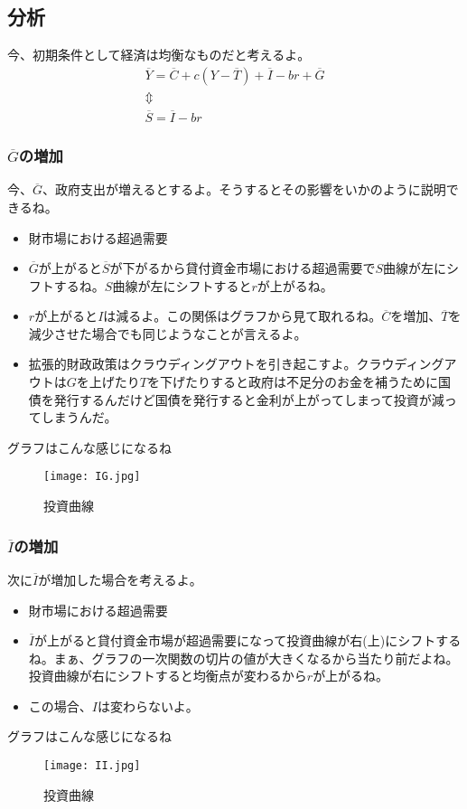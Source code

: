 \documentclass[a4paper, 12pt]{article}
\begin{document}
\subsection{分析}
今、初期条件として経済は均衡なものだと考えるよ。
\begin{displaymath}
  \begin{array}{c}
    \overline{Y}=\overline{C}+c(Y-\overline{T})+\overline{I}-br+\overline{G}\\
    \Updownarrow \\
    \overline{S}=\overline{I}-br
  \end{array}
\end{displaymath}

\subsubsection{$\overline{G}$の増加}
今、$\overline{G}$、政府支出が増えるとするよ。そうするとその影響をいかのように説明できるね。
\begin{itemize}
  \item 財市場における超過需要
  \item $\overline{G}$が上がると$\overline{S}$が下がるから貸付資金市場における超過需要で$S$曲線が左にシフトするね。$S$曲線が左にシフトすると$r$が上がるね。
  \item $r$が上がると$I$は減るよ。この関係はグラフから見て取れるね。$\overline{C}$を増加、$\overline{T}$を減少させた場合でも同じようなことが言えるよ。
  \item 拡張的財政政策はクラウディングアウトを引き起こすよ。クラウディングアウトは$G$を上げたり$T$を下げたりすると政府は不足分のお金を補うために国債を発行するんだけど国債を発行すると金利が上がってしまって投資が減ってしまうんだ。
\end{itemize}
グラフはこんな感じになるね
\begin{figure}[h]
\begin{center}
\texttt{[image: IG.jpg]}
\caption{投資曲線}
\label{}
\end{center}
\end{figure}
\subsubsection{$\overline{I}$の増加}
次に$\overline{I}$が増加した場合を考えるよ。
\begin{itemize}
  \item 財市場における超過需要
  \item $\overline{I}$が上がると貸付資金市場が超過需要になって投資曲線が右(上)にシフトするね。まぁ、グラフの一次関数の切片の値が大きくなるから当たり前だよね。投資曲線が右にシフトすると均衡点が変わるから$r$が上がるね。
  \item この場合、$I$は変わらないよ。
\end{itemize}
グラフはこんな感じになるね
\begin{figure}[h]
\begin{center}
\texttt{[image: II.jpg]}
\caption{投資曲線}
\label{}
\end{center}
\end{figure}
\end{document}
